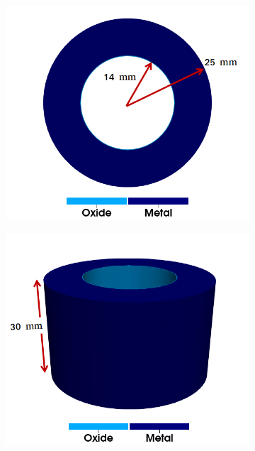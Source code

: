 \begin{frame}
  \vspace{-1.5em}
  \begin{columns}[T]
    \begin{column}{0.6\textwidth}
      \vspace{-1em}
      \begin{figure}
        \centering
        \begin{subfigure}{0.4\textwidth}
          \centering
          \includegraphics[width=\textwidth]{Chapter345/figures/top_view}
        \end{subfigure}
        \begin{subfigure}{0.4\textwidth}
          \centering
          \includegraphics[width=\textwidth]{Chapter345/figures/side_view}
        \end{subfigure}
        

\end{figure}
\end{column}
\end{columns}
\end{frame}
